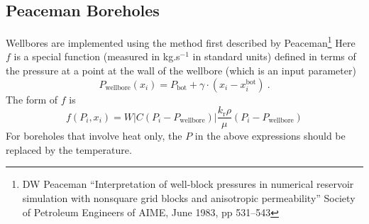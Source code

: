 \documentclass[12pt]{report}
\begin{document}
\subsection{Peaceman Boreholes}

Wellbores are implemented using the method first described by
Peaceman\footnote{DW Peaceman ``Interpretation of well-block pressures
  in numerical reservoir simulation with nonsquare grid blocks and
  anisotropic permeability'' Society of Petroleum Engineers of AIME,
  June 1983, pp 531--543}  Here $f$ is a
special function (measured in kg.s$^{-1}$ in standard
units) defined in terms of the pressure at a
point at the wall of the wellbore (which is an input parameter)
\begin{equation}
P_{\mathrm{wellbore}}(x_{i}) = P_{\mathrm{bot}} + \gamma \cdot (x_{i} -
x_{i}^{\mathrm{bot}}) \ .
\end{equation}
The form of $f$ is
\begin{equation}
f(P_{i}, x_{i}) =
W \left|C(P_{i}-P_{\mathrm{wellbore}})\right|
\frac{k_{\mathrm{r}}\rho}{\mu}(P_{i} - P_{\mathrm{wellbore}})
\end{equation}
For boreholes that involve heat only, the $P$ in the above expressions
should be replaced by the temperature.
\end{document}
